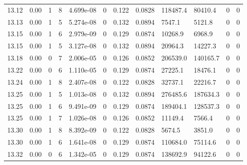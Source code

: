 \documentclass[preview]{standalone}
\begin{document}
{{{{{{{{{{{{{{{{\begin{tabular}{L{1.2cm}C{1.2cm} C{0.3cm}C{0.5cm} C{1.4cm}C{1.4cm} C{1.4cm}C{1.4cm} C{1.6cm}C{1.6cm} C{1.6cm}C{1.6cm}}
  13.12  &  0.00  & 1     &  8 &  4.699e-08  & 0  &  0.122&   0.0828& 118487.4 & 80410.4   &  0 & 0  \\ 
  13.13  &  0.00  & 1     &  5 &  5.274e-08  & 0  &  0.132&   0.0894& 7547.1 & 5121.8   &  0 & 0  \\ 
  13.15  &  0.00  & 1     &  6 &  2.979e-09  & 0  &  0.129&   0.0874& 10268.9 & 6968.9   &  0 & 0  \\ 
  13.15  &  0.00  & 1     &  5 &  3.127e-08  & 0  &  0.132&   0.0894& 20964.3 & 14227.3   &  0 & 0  \\ 
  13.18  &  0.00  & 0     &  7 &  2.006e-05  & 0  &  0.126&   0.0852& 206539.0 & 140165.7   &  0 & 0  \\ 
  13.22  &  0.00  & 0     &  6 &  1.110e-05  & 0  &  0.129&   0.0874& 27225.1 & 18476.1   &  0 & 0  \\ 
  13.24  &  0.00  & 1     &  8 &  2.407e-08  & 0  &  0.122&   0.0828& 32737.1 & 22216.7   &  0 & 0  \\ 
  13.25  &  0.00  & 1     &  5 &  1.013e-08  & 0  &  0.132&   0.0894& 276485.6 & 187634.3   &  0 & 0  \\ 
  13.25  &  0.00  & 1     &  6 &  9.491e-09  & 0  &  0.129&   0.0874& 189404.1 & 128537.3   &  0 & 0  \\ 
  13.25  &  0.00  & 1     &  7 &  1.026e-08  & 0  &  0.126&   0.0852& 11149.4 & 7566.4   &  0 & 0  \\ 
  13.30  &  0.00  & 1     &  8 &  8.392e-09  & 0  &  0.122&   0.0828& 5674.5 & 3851.0   &  0 & 0  \\ 
  13.30  &  0.00  & 1     &  6 &  1.641e-08  & 0  &  0.129&   0.0874& 110684.0 & 75114.6   &  0 & 0  \\ 
  13.32  &  0.00  & 0     &  6 &  1.342e-05  & 0  &  0.129&   0.0874& 138692.9 & 94122.6   &  0 & 0  \\ 
\hline 
\end{tabular} 

}}}}}}}}}}}}}}}}
\end{document}
